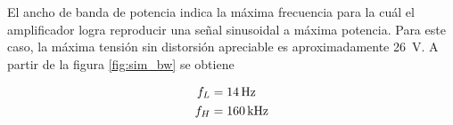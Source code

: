 

El ancho de banda de potencia indica la máxima frecuencia para la cuál el amplificador logra reproducir una señal sinusoidal a máxima potencia. Para este caso, la máxima tensión sin distorsión apreciable es aproximadamente \SI{26}{\volt}. A partir de la figura \ref{fig:sim_bw} se obtiene

\begin{align}
	\centering
	f_L &= \SI{14}{\hertz} \\
	f_H &= \SI{160}{\kilo\hertz}
\end{align}
